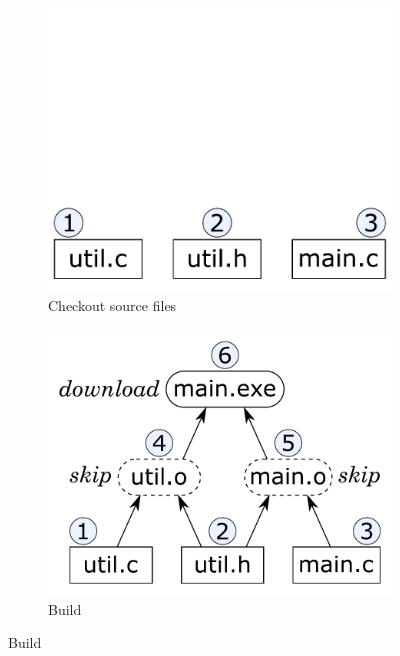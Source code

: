 \begin{figure}[t]
\begin{subfigure}[b]{0.25\linewidth}
\centerline{\includegraphics[scale=0.28]{fig/bazel-example-checkout.pdf}}
\vspace{-1mm}
\caption{Checkout source files}
\end{subfigure}
\begin{subfigure}[b]{0.40\linewidth}
\centerline{\includegraphics[scale=0.28]{fig/bazel-example-build.pdf}}
\vspace{-1mm}
\caption{Build }
\end{subfigure}

\end{figure}
